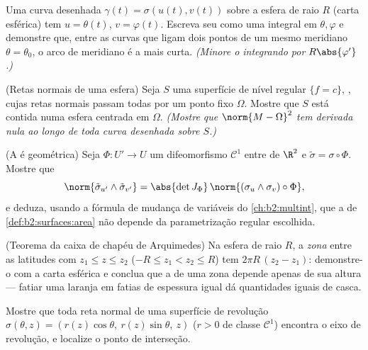 \begin{exercise}[$\star\star$]\label{exo:b2:surfaces:6}
Uma curva desenhada $\gamma(t) = \sigma(u(t), v(t))$ sobre a esfera de
raio $R$ (carta esférica) tem $u = \theta(t)$, $v =
\varphi(t)$. Escreva seu  como uma integral em $\theta, \varphi$
e demonstre que, entre as curvas que ligam dois pontos de um mesmo
meridiano $\theta = \theta_0$, o arco de meridiano é a mais curta.
\emph{(Minore o integrando por $R\abs{\varphi'}$.)}
\end{exercise}

\begin{exercise}[$\star\star\star$]\label{exo:b2:surfaces:7}
(Retas normais de uma esfera) Seja $S$ uma superfície de nível regular
$\{f = c\}$, , cujas retas normais passam todas por um
ponto fixo $\Omega$. Mostre que $S$ está contida numa esfera
centrada em $\Omega$. \emph{(Mostre que $\norm{M - \Omega}^2$ tem
derivada nula ao longo de toda curva desenhada sobre $S$.)}
\end{exercise}

\begin{exercise}[$\star\star\star$]\label{exo:b2:surfaces:8}
(A  é geométrica) Seja $\Phi \colon U' \to U$ um difeomorfismo
$\mathcal{C}^1$ entre  de $\R^2$ e $\tilde\sigma =
\sigma \circ \Phi$. Mostre que
\[
\norm{\tilde\sigma_{u'} \wedge \tilde\sigma_{v'}}
= \abs{\det J_\Phi}\,
\norm{(\sigma_u \wedge \sigma_v)\circ\Phi} ,
\]
e deduza, usando a fórmula de mudança de variáveis do
\cref{ch:b2:multint}, que a  de
\cref{def:b2:surfaces:area} não depende da parametrização regular
escolhida.
\end{exercise}

\begin{exercise}[$\star$]\label{exo:b2:surfaces:9}
(Teorema da caixa de chapéu de Arquimedes) Na esfera de raio $R$, a
\emph{zona} entre as latitudes com $z_1 \leq z \leq z_2$
($-R \leq z_1 < z_2 \leq R$) tem  $2\pi R\,(z_2 - z_1)$:
demonstre-o com a carta esférica e conclua que a  de uma zona
depende apenas de sua altura --- fatiar uma laranja em fatias de
espessura igual dá quantidades iguais de casca.
\end{exercise}

\begin{exercise}[$\star\star$]\label{exo:b2:surfaces:10}
Mostre que toda reta normal de uma superfície de revolução
$\sigma(\theta, z) = (r(z)\cos\theta,\ r(z)\sin\theta,\ z)$
($r > 0$ de classe $\mathcal C^1$) encontra o eixo de
revolução, e localize o ponto de interseção.
\end{exercise}

